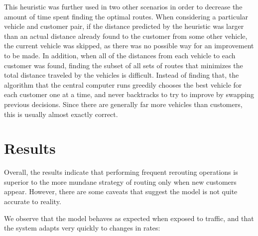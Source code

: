 \documentclass[Proceedings]{ascelike}
\begin{document}
\begin{algorithm}
\begin{algorithmic}[1]
                             
                        \EndIf
                    \EndFor
            \EndFor
        \EndFor
        \State {}
        \EndFunction
    \end{algorithmic}
\end{algorithm}

This heuristic was further used in two other scenarios in order to decrease the amount of time spent finding the
optimal routes. When considering a particular vehicle and customer pair, if the distance predicted by the heuristic
was larger than an actual distance already found to the customer from some other vehicle, the current vehicle was
skipped, as there was no possible way for an improvement to be made. In addition, when all of the distances from
each vehicle to each customer was found, finding the subset of all sets of routes that minimizes the total distance
traveled by the vehicles is difficult. Instead of finding that, the algorithm that the central computer runs greedily
chooses the best vehicle for each customer one at a time, and never backtracks to try to improve by swapping previous
decisions. Since there are generally far more vehicles than customers, this is usually almost exactly correct.

\pagebreak

\section*{Results}

Overall, the results indicate that performing frequent rerouting operations is superior to the more mundane strategy
of routing only when new customers appear. However, there are some caveats that suggest the model is not quite
accurate to reality.

We observe that the model behaves as expected when exposed to traffic, and that the system adapts very quickly to
changes in rates:
\end{document}
